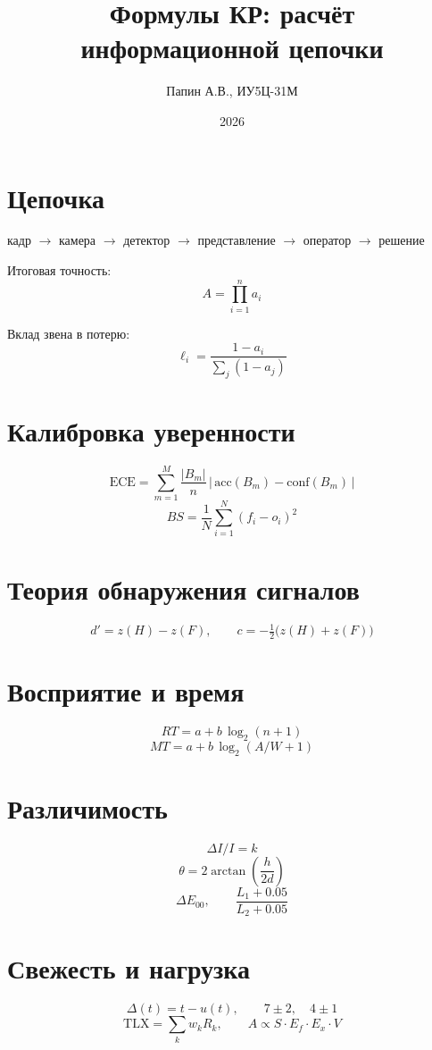 \documentclass[11pt]{article}
\title{Формулы КР: расчёт информационной цепочки}
\author{Папин А.В., ИУ5Ц-31М}
\date{2026}
\begin{document}
\maketitle

\section*{Цепочка}
кадр $\rightarrow$ камера $\rightarrow$ детектор $\rightarrow$
представление $\rightarrow$ оператор $\rightarrow$ решение

Итоговая точность:
\[
A = \prod_{i=1}^{n} a_i
\]

Вклад звена в потерю:
\[
\ell_i = \frac{1 - a_i}{\sum_j (1 - a_j)}
\]

\section*{Калибровка уверенности}
\[
\mathrm{ECE} = \sum_{m=1}^{M} \frac{|B_m|}{n}\,\bigl|\,\mathrm{acc}(B_m)
- \mathrm{conf}(B_m)\,\bigr|
\]
\[
BS = \frac{1}{N}\sum_{i=1}^{N} (f_i - o_i)^2
\]

\section*{Теория обнаружения сигналов}
\[
d' = z(H) - z(F), \qquad c = -\tfrac{1}{2}\bigl(z(H) + z(F)\bigr)
\]

\section*{Восприятие и время}
\[
RT = a + b\,\log_2(n+1)
\]
\[
MT = a + b\,\log_2(A/W + 1)
\]

\section*{Различимость}
\[
\Delta I / I = k
\]
\[
\theta = 2\arctan\!\left(\frac{h}{2d}\right)
\]
\[
\Delta E_{00}, \qquad \frac{L_1 + 0.05}{L_2 + 0.05}
\]

\section*{Свежесть и нагрузка}
\[
\Delta(t) = t - u(t), \qquad 7 \pm 2, \quad 4 \pm 1
\]
\[
\mathrm{TLX} = \sum_k w_k R_k, \qquad A \propto S \cdot E_f \cdot E_x \cdot V
\]
\end{document}
